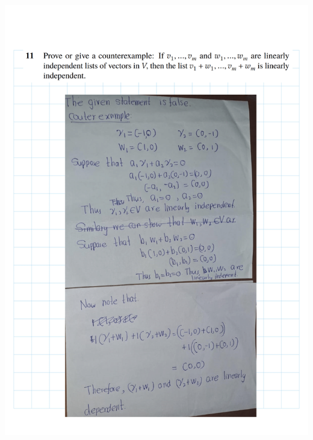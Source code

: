 \documentclass[
]{book}
\theoremstyle{definition}
\theoremstyle{definition}
\theoremstyle{definition}
\theoremstyle{definition}
\theoremstyle{remark}
\begin{document}
\includegraphics{fig/Ex2A/Ex2A-13.png}
\end{document}
